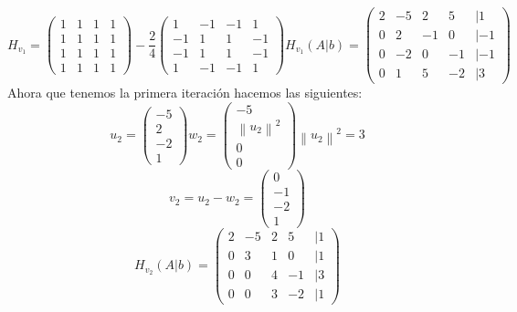 \[
        H_{v_1} = \begin{pmatrix}
                1 & 1 & 1 & 1 \\
                1 & 1 & 1 & 1 \\
                1 & 1 & 1 & 1 \\
                1 & 1 & 1 & 1
        \end{pmatrix}
        - \frac{2}{4}
        \begin{pmatrix}
                1  & -1 & -1 & 1  \\
                -1 & 1  & 1  & -1 \\
                -1 & 1  & 1  & -1 \\
                1  & -1 & -1 & 1
        \end{pmatrix}
        H_{v_1}(A|b) = \begin{pmatrix}
                2 & -5 & 2  & 5  & | 1  \\
                0 & 2  & -1 & 0  & | -1 \\
                0 & -2 & 0  & -1 & | -1 \\
                0 & 1  & 5  & -2 & |3
        \end{pmatrix}
\]
Ahora que tenemos la primera iteración hacemos las siguientes:
\[
        u_2 = \begin{pmatrix}
                -5 \\
                2  \\
                -2 \\
                1
        \end{pmatrix}
        w_2 = \begin{pmatrix}
                -5                       \\
                \left \| u_2 \right \|^2 \\
                0                        \\
                0
        \end{pmatrix}
        \left \| u_2 \right \|^2 = 3
\]
\[
        v_2 = u_2 - w_2 =\begin{pmatrix}
                0  \\
                -1 \\
                -2 \\
                1
        \end{pmatrix}
\]
\[
        H_{v_2}(A|b) = \begin{pmatrix}
                2 & -5 & 2 & 5  & |1  \\
                0 & 3  & 1 & 0  & | 1 \\
                0 & 0  & 4 & -1 & |3
                \\ 0 &  0& 3 &  -2& |1
        \end{pmatrix}
\]
